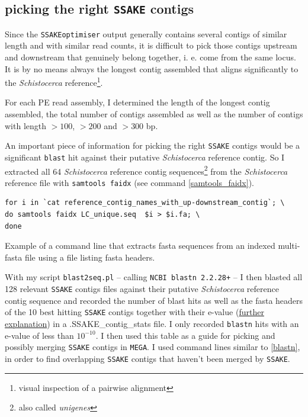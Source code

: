 \documentclass[a4paper,12pt,times,print,index,custombib,custommargin]{PhDThesisPSnPDF}\usepackage[]{graphicx}\usepackage[]{color}
\begin{document}
\FloatBarrier
\subsection{picking the right \texttt{SSAKE} contigs}\label{ch:picking_right_contig}

Since the \texttt{SSAKEoptimiser} output generally contains several \glspl{contig} of similar length and with similar read counts, it is difficult to pick those contigs upstream and downstream that genuinely belong together, i. e. come from the same locus. It is by no means always the longest \gls{contig} assembled that aligns significantly to the \textit{Schistocerca} reference\footnote{visual inspection of a pairwise alignment}.

For each PE read assembly, I determined the length of the longest contig assembled, the total number of contigs assembled as well as the number of contigs with length $>100$, $>200$ and $>300$ \gls{bp}.

An important piece of information for picking the right \texttt{SSAKE} contigs would be a significant \texttt{blast} hit against their putative \textit{Schistocerca} reference contig. So I extracted all 64 \textit{Schistocerca} reference contig sequences\footnote{also called \emph{unigenes}} from the \textit{Schistocerca} reference file with \texttt{samtools faidx} (see command \ref{samtools_faidx}).

\begin{cmd}
\captionsetup{type=cmd}
\begin{Verbatim}[fontsize=\scriptsize, formatcom=\color{darkgray}]
for i in `cat reference_contig_names_with_up-downstream_contig`; \
do samtools faidx LC_unique.seq  $i > $i.fa; \
done
\end{Verbatim}
\caption{\small Example of a command line that extracts fasta sequences from an indexed multi-fasta file using a file listing fasta headers.}
\label{samtools_faidx}
\end{cmd}

With my script \texttt{blast2seq.pl} -- calling \texttt{NCBI blastn 2.2.28+} \citep{Camacho2009} -- I then blasted all 128 relevant \texttt{SSAKE} contigs files against their putative \textit{Schistocerca} reference contig sequence and recorded the number of blast hits as well as the fasta headers of the 10 best hitting \texttt{SSAKE} contigs together with their \gls{e-value} (\href{http://blast.ncbi.nlm.nih.gov/Blast.cgi?CMD=Web&PAGE_TYPE=BlastDocs&DOC_TYPE=FAQ#expect}{further explanation}) in a \textsf{.SSAKE\_contig\_stats} file. I only recorded \texttt{blastn} hits with an \gls{e-value} of less than $10^{-10}$. I then used this table as a guide for picking and possibly merging \texttt{SSAKE} contigs in \texttt{MEGA}. I used command lines similar to \ref{blastn}, in order to find overlapping \texttt{SSAKE} contigs that haven't been merged by \texttt{SSAKE}.
\end{document}
